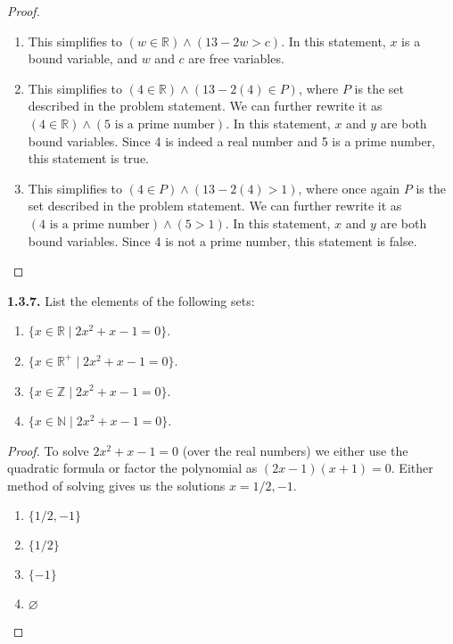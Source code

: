 \documentclass[12pt]{amsart}
\newenvironment{statement}[1]{\smallskip\noindent\color[rgb]{.6627, .3529, .6314} {\bf #1.}}{}
\theoremstyle{definition}
\theoremstyle{remark}
\newcommand{\BR}{\mathbb R}
\newcommand{\BZ}{\mathbb Z}
\newcommand{\BN}{\mathbb N}
\begin{document}
\begin{proof}
\hfill
\begin{enumerate}
	\item This simplifies to $(w \in \BR) \wedge (13 - 2w > c)$.
	In this statement, $x$ is a bound variable, and $w$ and $c$ are free variables.
	
	\item This simplifies to $(4 \in \BR) \wedge (13 - 2(4) \in P)$, where $P$ is the set described in the problem statement.
	We can further rewrite it as $(4 \in \BR) \wedge (5 \text{ is a prime number})$.
	In this statement, $x$ and $y$ are both bound variables.
	Since 4 is indeed a real number and 5 is a prime number, this statement is true.
	
	\item This simplifies to $(4 \in P) \wedge (13 - 2(4) > 1)$, where once again $P$ is the set described in the problem statement.
	We can further rewrite it as $(4 \text{ is a prime number}) \wedge (5 > 1)$.
	In this statement, $x$ and $y$ are both bound variables.
	Since 4 is not a prime number, this statement is false.
\end{enumerate}
\end{proof}


\begin{statement}{1.3.7}
List the elements of the following sets:
\begin{enumerate}
	\item $\{ x \in \BR \mid 2x^2 + x - 1 = 0 \}$.
	\item $\{ x \in \BR^{+} \mid 2x^2 + x - 1 = 0 \}$.
	\item $\{ x \in \BZ \mid 2x^2 + x - 1 = 0 \}$.
	\item $\{ x \in \BN \mid 2x^2 + x - 1 = 0 \}$.
\end{enumerate}
\end{statement}

\begin{proof}
To solve $2x^2 + x - 1 = 0$ (over the real numbers) we either use the quadratic formula or factor the polynomial as $(2x - 1)(x + 1) = 0$.
Either method of solving gives us the solutions $x = 1/2, -1$.
\begin{enumerate}
	\item $\{ 1/2, -1 \}$
	\item $\{ 1/2 \}$
	\item $\{ -1 \}$
	\item $\varnothing$
\end{enumerate}
\end{proof}
\end{document}
